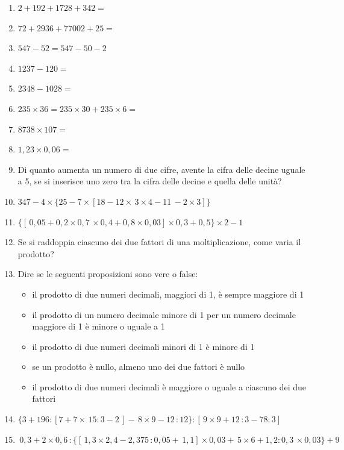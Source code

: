 \documentclass[]{article}
\newcommand*\vf {\hspace*{0em plus 1fill}\makebox{V \quad F}}
\newcommand*\result[1] {\hspace*{0em plus 1fill}{\footnotesize \makebox{[#1]}}}
\begin{document}
\begin{enumerate}
	\item \quad \(2 + 192 + 1728 + 342 = \)
	\item \quad \(72 + 2936 + 77002 + 25 = \)
	\item \quad \(547 - 52 = 547 - 50 - 2\)
	\item \quad \(1237 - 120 = \)
	\item \quad \(2348 - 1028 = \)
	\item \quad \(235 \times 36 = 235 \times 30 + 235 \times 6 = \)
	\item \quad \(8738 \times 107 = \)
	\item \quad \(1,23 \times 0,06 = \)
	\item {Di quanto aumenta un numero di due cifre, avente la cifra delle decine uguale a 5, se si inserisce uno zero tra la cifra delle decine e quella delle unità?}
	\item \quad \(347 - 4 \times \{ 25 - 7 \times [ 18 - 12 \times \, 3 \times 4 - 11\, - 2 \times 3 ] \} \) \result{247}
	\item \quad \(\{ [ \, 0,05 + 0,2 \times 0,7 \, \times 0,4 + 0,8 \times 0,03] \times 0,3 + 0,5 \} \times 2 - 1 \) \result{0,06}
	\item {Se si raddoppia ciascuno dei due fattori di una moltiplicazione, come varia il prodotto?}
	\item {Dire se le seguenti proposizioni sono vere o false:
	\begin{itemize}
		\item {il prodotto di due numeri decimali, maggiori di 1, è sempre maggiore di 1} \vf
		\item {il prodotto di un numero decimale minore di 1 per un numero decimale \\ maggiore di 1 è minore o uguale a 1} \vf
		\item {il prodotto di due numeri decimali minori di 1 è minore di 1} \vf
		\item {se un prodotto è nullo, almeno uno dei due fattori è nullo} \vf
		\item {il prodotto di due numeri decimali è maggiore o uguale a ciascuno dei due fattori} \vf
	\end{itemize}
	}

	\item \quad \( \{ 3 + 196 : [7+7\times\,15:3-2\,]-\,8\times9-12\,:12 \}:[\,9\times9+12\,:3-78:3] \) \result{1}
	
	\item \quad \(\,0,3+2\times0,6\,:\{[\,1,3\times2,4-2,375\,:0,05+\,1,1]\times0,03+\,5\times6+1,2:0,3\,\times0,03\}+9\) \result{10}
	

\end{enumerate}
\end{document}
